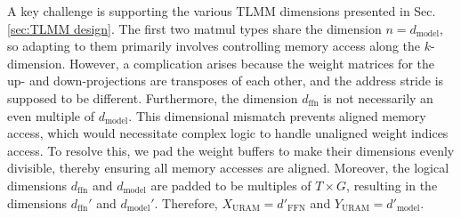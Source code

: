 \documentclass[sigconf]{acmart}
\begin{document}
A key challenge is supporting the various TLMM dimensions presented in Sec. \ref{sec:TLMM design}. The first two matmul types share the dimension $n = d_{\text{model}}$, so adapting to them primarily involves controlling memory access along the $k$-dimension. 
However, a complication arises because the weight matrices for the up- and down-projections are transposes of each other, and the address stride is supposed to be different. Furthermore, the dimension $d_{\text{ffn}}$ is not necessarily an even multiple of $d_{\text{model}}$. This dimensional mismatch prevents aligned memory access, which would necessitate complex logic to handle unaligned weight indices access. To resolve this, we pad the weight buffers to make their dimensions evenly divisible, thereby ensuring all memory accesses are aligned.
Moreover, the logical dimensions $d_{\text{ffn}}$ and $d_{\text{model}}$ are padded to be multiples of $T \times G$, resulting in the dimensions $d_{\text{ffn}}'$ and $d_{\text{model}}'$. Therefore, $X_{\text{URAM}} = d'_{\text{FFN}}$ and $Y_{\text{URAM}} = d'_{\text{model}}$.
\end{document}
